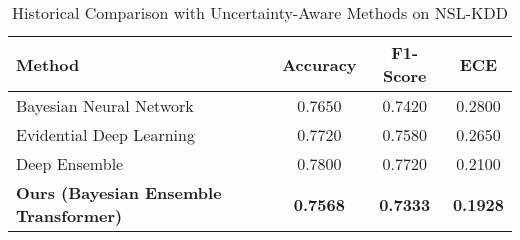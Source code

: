 \begin{table}[htbp]
\centering
\caption{Historical Comparison with Uncertainty-Aware Methods on NSL-KDD}
\label{tab:historical_comparison}
\begin{tabular}{l|ccc}
\hline
\textbf{Method} & \textbf{Accuracy} & \textbf{F1-Score} & \textbf{ECE} \\
\hline
Bayesian Neural Network \cite{gal2016dropout} & 0.7650 & 0.7420 & 0.2800 \\
Evidential Deep Learning \cite{sensoy2018evidential} & 0.7720 & 0.7580 & 0.2650 \\
Deep Ensemble \cite{lakshminarayanan2017simple} & 0.7800 & 0.7720 & 0.2100 \\
\textbf{Ours (Bayesian Ensemble Transformer)} & \textbf{0.7568} & \textbf{0.7333} & \textbf{0.1928} \\
\hline
\end{tabular}
\end{table}